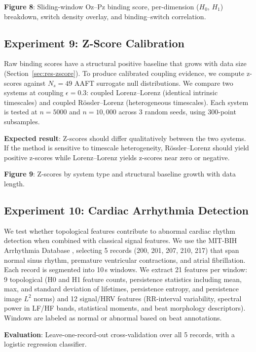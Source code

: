 \documentclass[11pt,a4paper]{article}
\begin{document}
\textbf{Figure 8}: Sliding-window Oz--Pz binding score, per-dimension ($H_0$, $H_1$) breakdown, switch density overlay, and binding--switch correlation.

\subsection{Experiment 9: Z-Score Calibration}\label{sec:exp-zscore}

Raw binding scores have a structural positive baseline that grows with data size (Section~\ref{sec:res-zscore}).
To produce calibrated coupling evidence, we compute z-scores against $N_s = 49$ AAFT surrogate null distributions.
We compare two systems at coupling $\epsilon = 0.3$: coupled Lorenz--Lorenz (identical intrinsic timescales) and coupled R\"ossler--Lorenz (heterogeneous timescales).
Each system is tested at $n = 5000$ and $n = 10{,}000$ across 3 random seeds, using 300-point subsamples.

\textbf{Expected result}: Z-scores should differ qualitatively between the two systems.
If the method is sensitive to timescale heterogeneity, R\"ossler--Lorenz should yield positive z-scores while Lorenz--Lorenz yields z-scores near zero or negative.

\textbf{Figure 9}: Z-scores by system type and structural baseline growth with data length.

\subsection{Experiment 10: Cardiac Arrhythmia Detection}\label{sec:exp-cardiac}

We test whether topological features contribute to abnormal cardiac rhythm detection when combined with classical signal features.
We use the MIT-BIH Arrhythmia Database \citep{moody2001impact}, selecting 5 records (200, 201, 207, 210, 217) that span normal sinus rhythm, premature ventricular contractions, and atrial fibrillation.
Each record is segmented into 10\,s windows.
We extract 21 features per window: 9 topological (H0 and H1 feature counts, persistence statistics including mean, max, and standard deviation of lifetimes, persistence entropy, and persistence image $L^2$ norms) and 12 signal/HRV features (RR-interval variability, spectral power in LF/HF bands, statistical moments, and beat morphology descriptors).
Windows are labeled as normal or abnormal based on beat annotations.

\textbf{Evaluation}: Leave-one-record-out cross-validation over all 5 records, with a logistic regression classifier.
\end{document}
